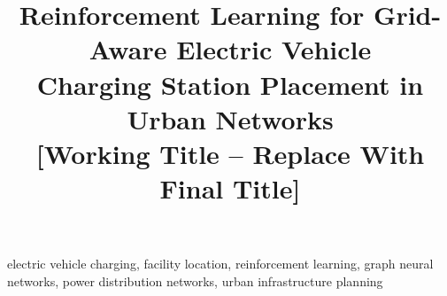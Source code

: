 \documentclass[conference]{IEEEtran}
\begin{document}
\title{Reinforcement Learning for Grid-Aware Electric Vehicle\\
Charging Station Placement in Urban Networks\\
\large[Working Title -- Replace With Final Title]}

\author{
}

\maketitle

\begin{abstract}
\end{abstract}

\begin{IEEEkeywords}
electric vehicle charging, facility location, reinforcement learning,
graph neural networks, power distribution networks, urban infrastructure planning
\end{IEEEkeywords}

\end{document}
